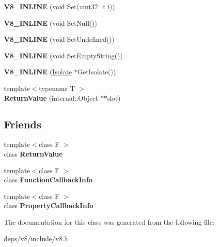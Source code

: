 \begin{DoxyCompactItemize}
\item 
\hypertarget{classv8_1_1_return_value_a551178b437f5c46f36b108450b6242b0}{}{\bfseries V8\+\_\+\+I\+N\+L\+I\+N\+E} (void Set(uint32\+\_\+t i))\label{classv8_1_1_return_value_a551178b437f5c46f36b108450b6242b0}

\item 
\hypertarget{classv8_1_1_return_value_a69e38cc4e6341d44559af0f970106d69}{}{\bfseries V8\+\_\+\+I\+N\+L\+I\+N\+E} (void Set\+Null())\label{classv8_1_1_return_value_a69e38cc4e6341d44559af0f970106d69}

\item 
\hypertarget{classv8_1_1_return_value_a13683f12411405ac33e0c50142846f85}{}{\bfseries V8\+\_\+\+I\+N\+L\+I\+N\+E} (void Set\+Undefined())\label{classv8_1_1_return_value_a13683f12411405ac33e0c50142846f85}

\item 
\hypertarget{classv8_1_1_return_value_acf480884e0a5095343ac388644adb0a2}{}{\bfseries V8\+\_\+\+I\+N\+L\+I\+N\+E} (void Set\+Empty\+String())\label{classv8_1_1_return_value_acf480884e0a5095343ac388644adb0a2}

\item 
\hypertarget{classv8_1_1_return_value_aacfd24196a9e33d173e23a84a0bba4ad}{}{\bfseries V8\+\_\+\+I\+N\+L\+I\+N\+E} (\hyperlink{classv8_1_1_isolate}{Isolate} $\ast$Get\+Isolate())\label{classv8_1_1_return_value_aacfd24196a9e33d173e23a84a0bba4ad}

\item 
\hypertarget{classv8_1_1_return_value_a26cf6ab11d7149526d4cdb81f3a75412}{}{\footnotesize template$<$typename T $>$ }\\{\bfseries Return\+Value} (internal\+::\+Object $\ast$$\ast$slot)\label{classv8_1_1_return_value_a26cf6ab11d7149526d4cdb81f3a75412}

\end{DoxyCompactItemize}
\subsection*{Friends}
\begin{DoxyCompactItemize}
\item 
\hypertarget{classv8_1_1_return_value_a53f604d3d6f2dc0647df33c9979f116a}{}{\footnotesize template$<$class F $>$ }\\class {\bfseries Return\+Value}\label{classv8_1_1_return_value_a53f604d3d6f2dc0647df33c9979f116a}

\item 
\hypertarget{classv8_1_1_return_value_a76786e6fa2d0eac5e2d4f647659d0d23}{}{\footnotesize template$<$class F $>$ }\\class {\bfseries Function\+Callback\+Info}\label{classv8_1_1_return_value_a76786e6fa2d0eac5e2d4f647659d0d23}

\item 
\hypertarget{classv8_1_1_return_value_a5018adab21fade2b42f4f60e45fa1083}{}{\footnotesize template$<$class F $>$ }\\class {\bfseries Property\+Callback\+Info}\label{classv8_1_1_return_value_a5018adab21fade2b42f4f60e45fa1083}

\end{DoxyCompactItemize}


The documentation for this class was generated from the following file\+:\begin{DoxyCompactItemize}
\item 
deps/v8/include/v8.\+h\end{DoxyCompactItemize}
